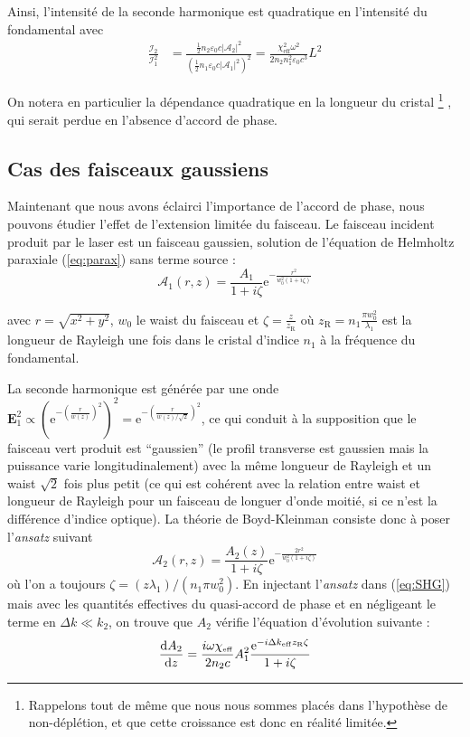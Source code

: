 \documentclass[11pt,a4paper] { article}
\newcommand{\zr}{z_\mathsc{R}}
\newcommand{\A}{\mathcal{A}}
\newcommand{\e}[1]{\text{e}^{#1}}
\newcommand{\mathsc}[1]{\mathrm{\scriptscriptstyle {#1}}}
\renewcommand{\v}[1]{\boldsymbol{\mathbf{#1}}}
\begin{document}
Ainsi, l'intensité de la seconde harmonique est quadratique en l'intensité du fondamental avec
\begin{align}
	\frac{\mathcal I_2}{\mathcal I_1^2} &= \frac{\frac12 n_2 \varepsilon_0 c |\A_2|^2}{\left(\frac12 n_1 \varepsilon_0 c |\A_1|^2\right)^2} 
	= \frac{\chi_\mathsc{eff}^2\omega^2}{2 n_2 n_1^2 \varepsilon_0 c^3} L^2
	\label{eq:plane}
\end{align}


On notera en particulier la dépendance quadratique en la longueur du cristal \footnote{Rappelons tout de même que nous nous sommes placés dans l'hypothèse de non-déplétion, et que cette croissance est donc en réalité limitée.}
, qui serait perdue en l'absence d'accord de phase. 
\subsection{Cas des faisceaux gaussiens} 

Maintenant que nous avons éclairci l'importance de l'accord de phase, nous pouvons étudier l'effet de l'extension limitée du faisceau. Le faisceau incident produit par le laser est un faisceau gaussien, solution de l'équation de Helmholtz paraxiale (\ref{eq:parax}) sans terme source :
$$
\A_1(r,z) = \frac{A_1}{1+i\zeta} \e{-\frac{r^{2}}{w_{0}^{2} (1+i\zeta) }}
$$

avec $r=\sqrt{x^2+y^2}$, $w_0$ le waist du faisceau et $\zeta = \frac{z}{z_\mathsc{R}}$ où $\zr= n_1 \frac{\pi w_0^2}{\lambda_1}$ est la longueur de Rayleigh une fois dans le cristal d'indice $n_1$ à la fréquence du fondamental.

La seconde harmonique est générée par une onde $\v E_1^2 \propto \left( \e{-\left(\frac{r}{w(z)}\right)^2} \right)^2 = \e{-\left(\frac{r}{w(z)/ \sqrt 2}\right)^2}$, ce qui conduit à la supposition que le faisceau vert produit est ``gaussien'' (le profil transverse est gaussien mais la puissance varie longitudinalement) avec la même longueur de Rayleigh et un waist $\sqrt 2$ fois plus petit (ce qui est cohérent avec la relation entre waist et longueur de Rayleigh pour un faisceau de longuer d'onde moitié, si ce n'est la différence d'indice optique).
La théorie de Boyd-Kleinman consiste donc à poser l'\textit{ansatz} suivant $$\A_2(r,z) = \frac{A_2(z)}{1+i\zeta}\e{-\frac{2r^{2}}{w_{0}^{2} (1+i\zeta) }} $$où l'on a toujours $\zeta = (z\lambda_1)/(n_1 \pi w_{0}^{2})$. %
En injectant l'\textit{ansatz} dans (\ref{eq:SHG}) mais avec les quantités effectives du quasi-accord de phase et en négligeant le terme en $\Delta k \ll k_2$, on trouve que $A_2$ vérifie l'équation d'évolution suivante :
\begin{align} 
	\dv{A_2}{z} = \frac{i\omega \chi_\mathsc{eff}}{2 n_2 c} A_1^2 \frac{\e{-i\Delta k_\mathsc{eff} \zr \zeta}}{1+i\zeta} 
	\label{eq:BKDE}
\end{align}
\end{document}
